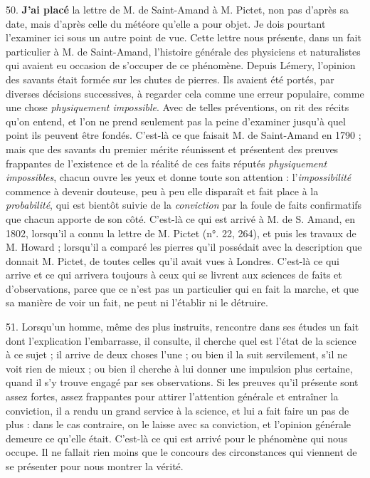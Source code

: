 \documentclass[a4paper, 11pt, oneside, polutonikogreek, french]{article}
\begin{document}
50. \textbf{J'ai placé} la lettre de M. de Saint-Amand à M. Pictet, non pas d'après sa date, mais d'après celle du météore qu'elle a pour objet. Je dois pourtant l'examiner ici sous un autre point de vue. Cette lettre nous présente, dans un fait particulier à M. de Saint-Amand, l'histoire générale des physiciens et naturalistes qui avaient eu occasion de s'occuper de ce phénomène. Depuis Lémery, l'opinion des savants était formée sur les chutes de pierres. Ils avaient été portés, par diverses décisions successives, à regarder cela comme une erreur populaire, comme une chose \emph{physiquement impossible}. Avec de telles préventions, on rit des récits qu'on entend, et l'on ne prend seulement pas la peine d'examiner jusqu'à quel point ils peuvent être fondés. C'est-là ce que faisait M. de Saint-Amand en 1790 ; mais que des savants du premier mérite réunissent et présentent des preuves frappantes de l'existence et de la réalité de ces faits réputés \emph{physiquement impossibles}, chacun ouvre les yeux et donne toute son attention : l'\emph{impossibilité} commence à devenir douteuse, peu à peu elle disparaît et fait place à la \emph{probabilité}, qui est bientôt suivie de la \emph{conviction} par la foule de faits confirmatifs que chacun apporte de son côté. C'est-là ce qui est arrivé à M. de S. Amand, en 1802, lorsqu'il a connu la lettre de M. Pictet (n°. 22, 264), et puis les travaux de M. Howard ; lorsqu'il a comparé les pierres qu'il possédait avec la description que donnait M. Pictet, de toutes celles qu'il avait vues à Londres. C'est-là ce qui arrive et ce qui arrivera toujours à ceux qui se livrent aux sciences de faits et d'observations, parce que ce n'est pas un particulier qui en fait la marche, et que sa manière de voir un fait, ne peut ni l'établir ni le détruire.

51. Lorsqu'un homme, même des plus instruits, rencontre dans ses études un fait dont l'explication l'embarrasse, il consulte, il cherche quel est l'état de la science à ce sujet ; il arrive de deux choses l'une ; ou bien il la suit servilement, s'il ne voit rien de mieux ; ou bien il cherche à lui donner une impulsion plus certaine, quand il s'y trouve engagé par ses observations. Si les preuves qu'il présente sont assez fortes, assez frappantes pour attirer l'attention générale et entraîner la conviction, il a rendu un grand service à la science, et lui a fait faire un pas de plus : dans le cas contraire, on le laisse avec sa conviction, et l'opinion générale demeure ce qu'elle était. C'est-là ce qui est arrivé pour le phénomène qui nous occupe. Il ne fallait rien moins que le concours des circonstances qui viennent de se présenter pour nous montrer la vérité.
\end{document}

